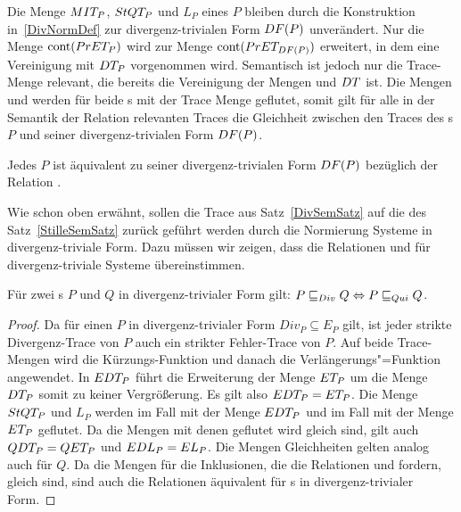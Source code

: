 Die Menge $MIT _P$, $StQT _P$ und $L_P$ eines \MEIO{} $P$ bleiben durch die
Konstruktion in~\ref{DivNormDef} zur divergenz-trivialen Form $DF (P)$
unverändert. Nur die Menge $\mathrm{cont} (PrET _P)$ wird zur Menge $\mathrm{cont} (PrET
_{DF (P)})$ erweitert, in dem eine Vereinigung mit $DT _P$ vorgenommen wird.
Semantisch ist jedoch nur die Trace-Menge \EDT{} relevant, die bereits die
Vereinigung der Mengen \ET{} und $DT{}$ ist. Die Mengen \QDT{} und \EDL{}
werden für beide \MEIO{}s mit der Trace Menge \EDT{} geflutet, somit gilt für
alle in der Semantik der Relation \DRel{} relevanten Traces die Gleichheit
zwischen den Traces des \MEIO{}s $P$ und seiner divergenz-trivialen Form $DF
(P)$.

\begin{Prop}
  \label{DivNormProp}
  Jedes \MEIO{} $P$ ist äquivalent zu seiner divergenz-trivialen Form $DF (P)$
  bezüglich der Relation \DRel{}.
\end{Prop}

Wie schon oben erwähnt, sollen die Trace aus Satz~\ref{DivSemSatz} auf die des
Satz~\ref{StilleSemSatz} zurück geführt werden durch die Normierung Systeme in
divergenz-triviale Form. Dazu müssen wir zeigen, dass die Relationen \DRel{}
und \QRel{} für divergenz-triviale Systeme übereinstimmen.

\begin{Lem}
  \label{QDRelDivNormLem}
  Für zwei \MEIO{}s $P$ und $Q$ in divergenz-trivialer Form gilt: $P  \sqsubseteq  _{Div} Q
  \Leftrightarrow P  \sqsubseteq  _{Qui} Q$.
\end{Lem}
\begin{proof}
  Da für einen \MEIO{} $P$ in divergenz-trivialer Form $Div _P \subseteq E _P$
  gilt, ist jeder strikte Divergenz-Trace von $P$ auch ein strikter
  Fehler-Trace von $P$. Auf beide Trace-Mengen wird die Kürzungs-Funktion
  \prune{} und danach die Verlängerungs"=Funktion \cont{} angewendet. In $EDT
  _P$ führt die Erweiterung der Menge $ET _P$ um die Menge $DT _P$ somit zu
  keiner Vergrößerung. Es gilt also $EDT _P = ET _P$. Die Menge $StQT _P$
  und $L _P$ werden im Fall \DRel{} mit der Menge $EDT _P$ und im Fall \QRel{}
  mit der Menge $ET _P$ geflutet. Da die Mengen mit denen geflutet wird gleich
  sind, gilt auch $QDT _P = QET _P$ und $EDL _P = EL _P$. Die Mengen
  Gleichheiten gelten analog auch für $Q$. Da die Mengen für die Inklusionen,
  die die Relationen \DRel{} und \QRel{} fordern, gleich sind, sind auch die
  Relationen äquivalent für \MEIO{}s in divergenz-trivialer Form.
\end{proof}

